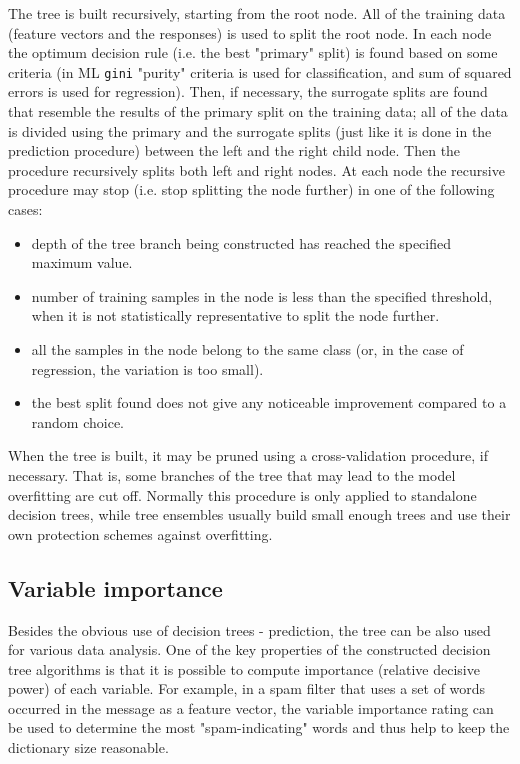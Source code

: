The tree is built recursively, starting from the root node. All of the training data (feature vectors and the responses) is used to split the root node. In each node the optimum decision rule (i.e. the best "primary" split) is found based on some criteria (in ML \texttt{gini} "purity" criteria is used for classification, and sum of squared errors is used for regression). Then, if necessary, the surrogate splits are found that resemble the results of the primary split on the training data; all of the data is divided using the primary and the surrogate splits (just like it is done in the prediction procedure) between the left and the right child node. Then the procedure recursively splits both left and right nodes. At each node the recursive procedure may stop (i.e. stop splitting the node further) in one of the following cases:
\begin{itemize}
\item{depth of the tree branch being constructed has reached the specified maximum value.}
\item{number of training samples in the node is less than the specified threshold, when it is not statistically representative to split the node further.}
\item{all the samples in the node belong to the same class (or, in the case of regression, the variation is too small).}
\item{the best split found does not give any noticeable improvement compared to a random choice.}
\end{itemize}
When the tree is built, it may be pruned using a cross-validation procedure, if necessary. That is, some branches of the tree that may lead to the model overfitting are cut off. Normally this procedure is only applied to standalone decision trees, while tree ensembles usually build small enough trees and use their own protection schemes against overfitting.

\subsection{Variable importance}

Besides the obvious use of decision trees - prediction, the tree can be also used for various data analysis. One of the key properties of the constructed decision tree algorithms is that it is possible to compute importance (relative decisive power) of each variable. For example, in a spam filter that uses a set of words occurred in the message as a feature vector, the variable importance rating can be used to determine the most "spam-indicating" words and thus help to keep the dictionary size reasonable.

